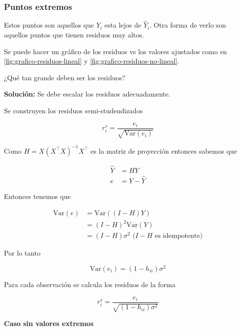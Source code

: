 \documentclass[
  12pt,
]{book}
\theoremstyle{definition}
\theoremstyle{definition}
\theoremstyle{definition}
\theoremstyle{remark}
\begin{document}
\hypertarget{puntos-extremos}{%
\subsubsection{Puntos extremos}\label{puntos-extremos}}

Estos puntos son aquellos que \(Y_i\) esta lejos de \(\hat{Y}_i\). Otra forma de verlo son aquellos puntos que tienen residuos muy altos.

Se puede hacer un gráfico de los residuos vs los valores ajustados como en \ref{fig:grafico-residuos-lineal} y \ref{fig:grafico-residuos-no-lineal}.

¿Qué tan grande deben ser los residuos?

\textbf{Solución:} Se debe escalar los residuos adecuadamente.

Se construyen los residuos semi-studendizados

\begin{equation*}
r_{i}^{s} = \frac{e_{i}}{\sqrt{\mathrm{Var}\left(e_{i}\right)}} 
\end{equation*}

Como \(H=X(X^{\top}X)^{-1}X^{\top}\) es la matriz de proyección entonces sabemos que

\begin{align*}
\hat{Y}&=  H Y \\
e &= Y - \hat{Y}  
\end{align*}

Entonces tenemos que

\begin{align*}
\mathrm{Var}\left(e\right) 
&=  \mathrm{Var}\left((I-H)Y\right)\\
&= (I-H)^{2}\mathrm{Var}\left(Y\right)\\
&= (I-H) \sigma^{2} \text{ (\(I-H\) es idempotente)}
\end{align*}

Por lo tanto

\begin{equation*}
\mathrm{Var}\left(e_{i}\right) = (1-h_{ii}) \sigma^{2}
\end{equation*}

Para cada observación se calcula los residuos de la forma

\begin{equation*}
r_{i}^{s} = \frac{e_i}{\sqrt{(1-h_{ii}) \sigma^{2}}}
\end{equation*}

\textbf{Caso sin valores extremos}
\end{document}

